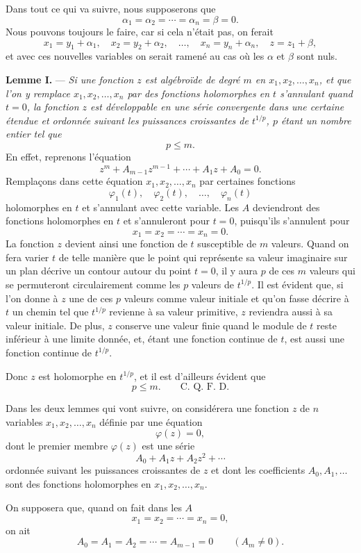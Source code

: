 \documentclass[11pt]{article}
\begin{document}
Dans tout ce qui va suivre, nous supposerons que
\[
\alpha_1=\alpha_2=\cdots=\alpha_n=\beta=0.
\]
Nous pouvons toujours le faire, car si cela n'était pas, on ferait
\[
x_1=y_1+\alpha_1,
\quad x_2=y_2+\alpha_2,
\quad \ldots,
\quad x_n=y_n+\alpha_n,
\quad z=z_1+\beta,
\]
et avec ces nouvelles variables on serait ramené au cas où les $\alpha$ et $\beta$ sont nuls.

\medskip
\noindent\textbf{Lemme I.} — \emph{Si une fonction $z$ est algébroïde de degré $m$ en $x_1,x_2,\ldots,x_n$, et que l'on y remplace $x_1,x_2,\ldots,x_n$ par des fonctions holomorphes en $t$ s'annulant quand $t=0$, la fonction $z$ est développable en une série convergente dans une certaine étendue et ordonnée suivant les puissances croissantes de $t^{1/p}$, $p$ étant un nombre entier tel que}
\[
p\le m.
\]
En effet, reprenons l'équation
\[
z^m+A_{m-1}z^{m-1}+\cdots+A_1z+A_0=0.
\]
Remplaçons dans cette équation $x_1,x_2,\ldots,x_n$ par certaines fonctions
\[
\varphi_1(t),\quad \varphi_2(t),\quad \ldots,
\quad \varphi_n(t)
\]
holomorphes en $t$ et s'annulant avec cette variable. Les $A$ deviendront des fonctions holomorphes en $t$ et s'annuleront pour $t=0$, puisqu'ils s'annulent pour
\[
x_1=x_2=\cdots=x_n=0.
\]
La fonction $z$ devient ainsi une fonction de $t$ susceptible de $m$ valeurs. Quand on fera varier $t$ de telle manière que le point qui représente sa valeur imaginaire sur un plan décrive un contour autour du point $t=0$, il y aura $p$ de ces $m$ valeurs qui se permuteront circulairement comme les $p$ valeurs de $t^{1/p}$. Il est évident que, si l'on donne à $z$ une de ces $p$ valeurs comme valeur initiale et qu'on fasse décrire à $t$ un chemin tel que $t^{1/p}$ revienne à sa valeur primitive, $z$ reviendra aussi à sa valeur initiale. De plus, $z$ conserve une valeur finie quand le module de $t$ reste inférieur à une limite donnée, et, étant une fonction continue de $t$, est aussi une fonction continue de $t^{1/p}$.

Donc $z$ est holomorphe en $t^{1/p}$, et il est d'ailleurs évident que
\[
p\le m. \qquad \text{C. Q. F. D.}
\]

Dans les deux lemmes qui vont suivre, on considérera une fonction $z$ de $n$ variables $x_1,x_2,\ldots,x_n$ définie par une équation
\[
\varphi(z)=0,
\]
dont le premier membre $\varphi(z)$ est une série
\[
A_0+A_1z+A_2z^2+\cdots
\]
ordonnée suivant les puissances croissantes de $z$ et dont les coefficients $A_0,A_1,\ldots$ sont des fonctions holomorphes en $x_1,x_2,\ldots,x_n$.

On supposera que, quand on fait dans les $A$
\[
x_1=x_2=\cdots=x_n=0,
\]
on ait
\[
A_0=A_1=A_2=\cdots=A_{m-1}=0
\qquad (A_m\ne0).
\]
\end{document}

